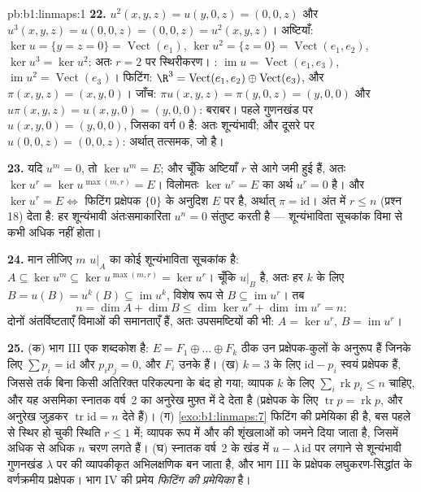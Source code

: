 \begin{solution}{pb:b1:linmaps:1}
\textbf{22.} $u^2(x,y,z) = u(y, 0, z) = (0, 0, z)$ और $u^3(x,y,z) = u(0,0,z)
= (0,0,z) = u^2(x,y,z)$। अष्टियाँ: $\ker u = \{y = z = 0\} =
\operatorname{Vect}(e_1)$, $\ker u^2 = \{z = 0\} = \operatorname{Vect}(e_1,
e_2)$, $\ker u^3 = \ker u^2$: अतः $r = 2$ पर स्थिरीकरण। :
$\operatorname{im} u = \operatorname{Vect}(e_1, e_3)$, $\operatorname{im}
u^2 = \operatorname{Vect}(e_3)$। फिटिंग: $\R^3 = \operatorname{Vect}(e_1,
e_2) \oplus \operatorname{Vect}(e_3)$, और $\pi(x, y, z) = (x, y, 0)$। जाँच:
$\pi u(x,y,z) = \pi(y, 0, z) = (y, 0, 0)$ और $u\pi(x,y,z) = u(x, y, 0) = (y,
0, 0)$: बराबर। पहले गुणनखंड पर $u(x, y, 0) = (y, 0, 0)$, जिसका वर्ग $0$ है:
अतः शून्यंभावी; और दूसरे पर $u(0,0,z) = (0,0,z)$: अर्थात् तत्समक, जो  है।

\textbf{23.} यदि $u^m = 0$, तो $\ker u^m = E$; और चूँकि अष्टियाँ $r$ से आगे
जमी हुई हैं, अतः $\ker u^{r} = \ker u^{\max(m, r)} = E$। विलोमतः $\ker u^{r}
= E$ का अर्थ $u^{r} = 0$ है। और $\ker u^{r} = E \iff$ फिटिंग प्रक्षेपक
$\{0\}$ के अनुदिश $E$ पर है, अर्थात् $\pi = \mathrm{id}$। अंत में $r \leq n$
(प्रश्न 18) देता है: हर शून्यंभावी अंतःसमाकारिता $u^{n} = 0$ संतुष्ट करती है
--- शून्यंभाविता सूचकांक विमा से कभी अधिक नहीं होता।

\textbf{24.} मान लीजिए $m$ $u|_A$ का कोई शून्यंभाविता सूचकांक है: $A
\subseteq \ker u^{m} \subseteq \ker u^{\max(m,r)} = \ker u^{r}$। चूँकि
$u|_B$  है, अतः हर $k$ के लिए $B = u(B) = u^{k}(B) \subseteq
\operatorname{im} u^{k}$, विशेष रूप से $B \subseteq \operatorname{im}
u^{r}$। तब
\[
n = \dim A + \dim B \leq \dim\ker u^{r} +
\dim\operatorname{im} u^{r} = n :
\]
दोनों अंतर्विष्टताएँ विमाओं की समानताएँ हैं, अतः उपसमष्टियों की भी: $A =
\ker u^{r}$, $B = \operatorname{im} u^{r}$।

\textbf{25.} (क) भाग III एक शब्दकोश है:  $E = F_1 \oplus \dots \oplus
F_k$ ठीक उन प्रक्षेपक-कुलों के अनुरूप हैं जिनके लिए $\sum p_i = \mathrm{id}$
और $p_i p_j = 0$, और $F_i$ उनके  हैं। (ख) $k = 3$ के लिए 
$\mathrm{id} - p_i$ स्वयं प्रक्षेपक हैं, जिससे तर्क बिना किसी अतिरिक्त
परिकल्पना के बंद हो गया; व्यापक $k$ के लिए $\sum_i \operatorname{rk} p_i
\leq n$ चाहिए, और यह असमिका स्नातक वर्ष~2 का अनुरेख मुफ़्त में दे देता है
(प्रक्षेपक के लिए $\operatorname{tr} p = \operatorname{rk} p$, और अनुरेख
जुड़कर $\operatorname{tr} \mathrm{id} = n$ देते हैं)। (ग)
\cref{exo:b1:linmaps:7} फिटिंग की प्रमेयिका ही है, बस पहले से स्थिर हो चुकी
स्थिति $r \leq 1$ में; व्यापक रूप में  और  की शृंखलाओं को जमने
दिया जाता है, जिसमें अधिक से अधिक $n$ चरण लगते हैं। (घ) स्नातक वर्ष~2 के खंड
में $u - \lambda\, \mathrm{id}$ पर लगाने से शून्यंभावी गुणनखंड $\lambda$ पर
की व्यापकीकृत अभिलक्षणिक  बन जाता है, और भाग III के प्रक्षेपक
लघुकरण-सिद्धांत के वर्णक्रमीय प्रक्षेपक। भाग IV की प्रमेय \emph{फिटिंग की
प्रमेयिका} है।
\end{solution}
